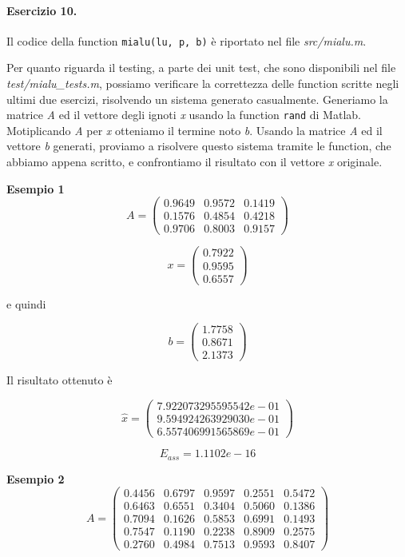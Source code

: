 \paragraph{Esercizio 10.} Il codice della function \verb|mialu(lu, p, b)| è riportato nel file \emph{src/mialu.m}.

Per quanto riguarda il testing, a parte dei unit test, che sono disponibili nel file \emph{test/mialu\_tests.m}, possiamo verificare la correttezza delle function scritte negli ultimi due esercizi, risolvendo un sistema generato casualmente. Generiamo la matrice \emph{A} ed il vettore degli ignoti \emph{x} usando la function \verb|rand| di Matlab. Motiplicando \emph{A} per \emph{x} otteniamo il termine noto \emph{b}. Usando la matrice \emph{A} ed il vettore \emph{b} generati, proviamo a risolvere questo sistema tramite le function, che abbiamo appena scritto, e confrontiamo il risultato con il vettore \emph{x} originale.

\textbf{Esempio 1}
\[
A = \begin{pmatrix}
0.9649 & 0.9572 & 0.1419\\
0.1576 & 0.4854 & 0.4218\\
0.9706 & 0.8003 & 0.9157
\end{pmatrix}
\]

\[
x = \begin{pmatrix}
0.7922\\
0.9595\\
0.6557
\end{pmatrix}
\]

e quindi

\[
b = \begin{pmatrix}
1.7758\\
0.8671\\
2.1373
\end{pmatrix}
\]

Il risultato ottenuto è

\[
\hat{x} = \begin{pmatrix}
7.922073295595542e-01\\
9.594924263929030e-01\\
6.557406991565869e-01
\end{pmatrix}
\]

\[
E_{ass} = 1.1102e-16
\]

\textbf{Esempio 2}
\[
A = \begin{pmatrix}
0.4456 & 0.6797 & 0.9597 & 0.2551 & 0.5472\\
0.6463 & 0.6551 & 0.3404 & 0.5060 & 0.1386\\
0.7094 & 0.1626 & 0.5853 & 0.6991 & 0.1493\\
0.7547 & 0.1190 & 0.2238 & 0.8909 & 0.2575\\
0.2760 & 0.4984 & 0.7513 & 0.9593 & 0.8407
\end{pmatrix}
\]

